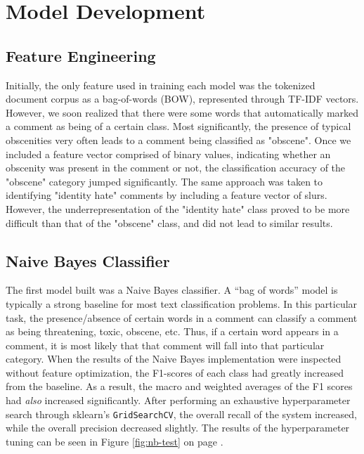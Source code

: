 \documentclass{article}
\begin{document}
\section{Model Development}{
  \subsection{Feature Engineering}{
	  Initially, the only feature used in training each model was the tokenized
	  document corpus as a bag-of-words (BOW), represented through TF-IDF vectors.
	  However, we soon realized that there were some words that automatically
	  marked a comment as being of a certain class. Most significantly, the
	  presence of typical obscenities very often leads to a comment being
	  classified as "obscene". Once we included a feature vector comprised of
	  binary values, indicating whether an obscenity was present in the comment or
	  not, the classification accuracy of the "obscene" category jumped
	  significantly. The same approach was taken to identifying "identity hate"
	  comments by including a feature vector of slurs. However, the
	  underrepresentation of the "identity hate" class proved to be more difficult
	  than that of the "obscene" class, and did not lead to similar results.
  }
  \subsection{Naive Bayes Classifier}{
	  The first model built was a Naive Bayes classifier. A “bag of words” model
	  is typically a strong baseline for most text classification problems. In
	  this particular task, the presence/absence of certain words in a comment can
	  classify a comment as being threatening, toxic, obscene, etc. Thus, if a
	  certain word appears in a comment, it is most likely that that comment will
	  fall into that particular category. When the results of the Naive Bayes
	  implementation were inspected without feature optimization, the F1-scores of
	  each class had greatly increased from the baseline. As a result, the macro
	  and weighted averages of the F1 scores had \textit{also} increased
	  significantly. After performing an exhaustive hyperparameter search through
	  sklearn's \texttt{GridSearchCV}, the overall recall of the system increased,
	  while the overall precision decreased slightly. The results of the
	  hyperparameter tuning can be seen in Figure \ref{fig:nb-test} on page
	  \pageref{fig:nb-test}.

}}
\end{document}
